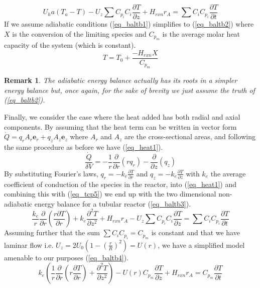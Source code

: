 \documentclass[11pt,fleqn]{article}
\theoremstyle{defstyle}
\newtheorem{rmrk}{Remark}[section]
\begin{document}
\begin{equation}
U_ha(T_a-T) - U_z\sum C_{p_i}C_i \frac{\partial T}{\partial z} + H_{rxn}r_A = \sum C_i C_{p_i} \frac{\partial T}{\partial t}
\label{eq_baltb1}
\end{equation}
If we assume adiabatic conditions (\ref{eq_baltb1}) simplifies to (\ref{eq_baltb2}) where $X$ is the conversion of the limiting species and $C_{p_m}$ is the average molar heat capacity of the system (which is constant).
\begin{equation}
T = T_0 + \frac{-H_{rxn}X}{C_{p_m}}
\label{eq_baltb2}
\end{equation}
\begin{rmrk}
The adiabatic energy balance actually has its roots in a simpler energy balance but, once again, for the sake of brevity we just assume the truth of (\ref{eq_baltb2}).
\end{rmrk}
Finally, we consider the case where the heat added has both radial and axial components. By assuming that the heat term can be written in vector form $\dot{Q} = q_r A_r \mathbf{e}_r + q_z A_z \mathbf{e}_z$  where $A_r$ and $A_z$ are the cross-sectional areas, and following the same procedure as before we have (\ref{eq_heat1}).
\begin{equation}
\frac{\dot{Q}}{\delta V} = -\frac{1}{r}\frac{\partial}{\partial r}\left(r q_r\right) - \frac{\partial}{\partial z}\left(q_z\right)
\label{eq_heat1}
\end{equation}
By substituting Fourier's laws, $q_r = -k_e\frac{\partial T}{\partial r}$ and $q_z = -k_e\frac{\partial T}{\partial z}$ with $k_e$ the average coefficient of conduction of the species in the reactor, into (\ref{eq_heat1}) and combining this with (\ref{eq_tcp5}) we end up with the two dimensional non-adiabatic energy balance for a tubular reactor (\ref{eq_baltb3}).
\begin{equation}
\frac{k_e}{r}\frac{\partial}{\partial r}\left(\frac{r\partial T}{\partial r}\right) + k_e\frac{\partial ^2 T}{\partial z^2} + H_{rxn}r_A - U_z\sum C_{p_i}C_i \frac{\partial T}{\partial z} =\sum C_i C_{p_i} \frac{\partial T}{\partial t}
\label{eq_baltb3}
\end{equation}
Assuming further that the sum $\sum C_i C_{p_i} = C_{p_m}$ is constant and that we have laminar flow i.e. $U_z = 2U_0(1-(\frac{r}{R})^2) = U(r)$, we have a simplified model amenable to our purposes (\ref{eq_baltb4}).
\begin{equation}
k_e\left(\frac{1}{r}\frac{\partial}{\partial r}\left(r\frac{\partial T}{\partial r}\right) + \frac{\partial ^2 T}{\partial z^2}\right) - U(r) C_{p_m} \frac{\partial T}{\partial z} + H_{rxn}r_A = C_{p_m} \frac{\partial T}{\partial t}
\label{eq_baltb4}
\end{equation}
\end{document}
